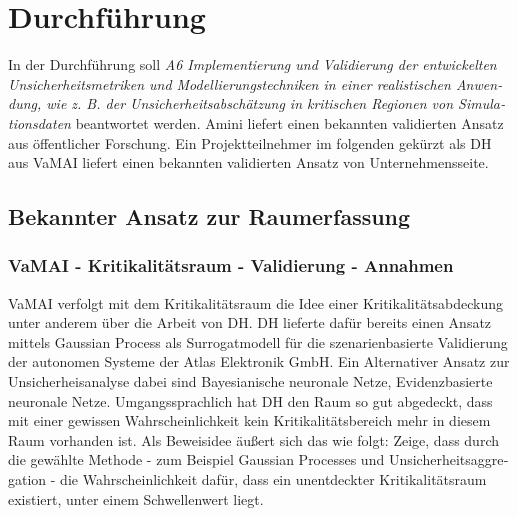 
\chapter{Durchführung}\label{chapter:durchfuehrung}



\begin{otherlanguage}{american}
  
\end{otherlanguage}



\begin{otherlanguage}{ngerman}

In der Durchführung soll \textit{A6 Implementierung und Validierung der entwickelten Unsicherheitsmetriken und Modellierungstechniken in einer realistischen Anwendung, wie z. B. der Unsicherheitsabschätzung in kritischen Regionen von Simulationsdaten} beantwortet werden. Amini \parencite{amini2020deep} liefert einen bekannten validierten Ansatz aus öffentlicher Forschung. Ein Projektteilnehmer im folgenden gekürzt als DH aus VaMAI liefert einen bekannten validierten Ansatz von Unternehmensseite. 

\section*{Bekannter Ansatz zur Raumerfassung}

\subsection*{VaMAI - Kritikalitätsraum - Validierung - Annahmen}

VaMAI verfolgt mit dem Kritikalitätsraum die Idee einer Kritikalitätsabdeckung unter anderem über die Arbeit von DH. DH lieferte dafür bereits einen Ansatz mittels \glqq{}Gaussian Process\grqq{} als Surrogatmodell für die szenarienbasierte Validierung der autonomen Systeme der Atlas Elektronik GmbH. Ein Alternativer Ansatz zur Unsicherheisanalyse dabei sind \gls{Bayesianische neuronale Netze}, \gls{Evidenzbasierte neuronale Netze}. Umgangssprachlich hat DH den Raum so gut abgedeckt, dass mit einer gewissen Wahrscheinlichkeit kein Kritikalitätsbereich mehr in diesem Raum vorhanden ist. Als Beweisidee äußert sich das wie folgt: Zeige, dass durch die gewählte Methode - zum Beispiel Gaussian Processes und Unsicherheitsaggregation - die Wahrscheinlichkeit dafür, dass ein unentdeckter Kritikalitätsraum existiert, unter einem Schwellenwert liegt.


\end{otherlanguage}
